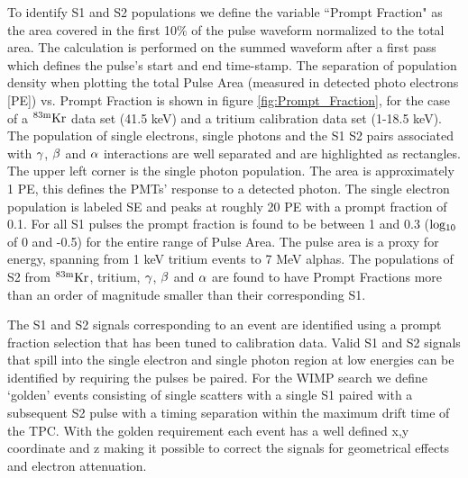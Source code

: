 To identify S1 and S2 populations we define the variable ``Prompt Fraction" as the area covered in the first 10\% of the pulse waveform normalized to the total area. The calculation is performed on the summed waveform after a first pass which defines the pulse's start and end time-stamp. 
The separation of population density when plotting the total Pulse Area (measured in detected photo electrons [PE]) vs. Prompt Fraction is shown in figure \ref{fig:Prompt_Fraction},  for the case of a $\rm ^{83m}Kr$ data set (41.5 keV) and a tritium calibration data set (1-18.5 keV). The population of single electrons, single photons and the S1 S2 pairs associated with $\rm \gamma$, $\rm \beta$ and $\rm \alpha$ interactions are well separated and are highlighted as rectangles. The upper left corner is the single photon population. The area is approximately 1 PE, this defines the PMTs' response to a detected photon. The single electron population is labeled SE and peaks at roughly 20 PE with a prompt fraction of 0.1. For all S1 pulses the prompt fraction is found to be between 1 and 0.3 ($\rm log_{10}$ of 0 and -0.5) for the entire range of Pulse Area. The pulse area is a proxy for energy, spanning from 1 keV tritium events to 7 MeV alphas. The populations of S2 from $\rm^{83m}Kr$, tritium, $\rm \gamma$, $\rm \beta$ and $\rm \alpha$ are found to have Prompt Fractions more than an order of magnitude smaller than their corresponding S1. 


The S1 and S2 signals corresponding to an event are identified using a prompt fraction selection that has been tuned to calibration data. Valid S1 and S2 signals that spill into the single electron and single photon region at low energies can be identified by requiring the pulses be paired. For the WIMP search we define `golden' events consisting of single scatters with a single S1 paired with a subsequent S2 pulse with a timing separation within the maximum drift time of the TPC. With the golden requirement each event has a well defined x,y coordinate and z making it possible to correct the signals for geometrical effects and electron attenuation. 

